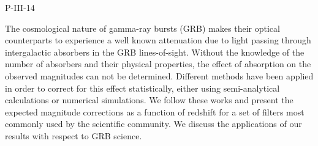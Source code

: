 P-III-14


\bigskip



\bigskip

\noindent The cosmological nature of gamma-ray bursts (GRB) makes their optical counterparts to experience a well known attenuation due to light passing through intergalactic absorbers in the GRB lines-of-sight. Without the knowledge of the number of absorbers and their physical properties, the effect of absorption on the observed magnitudes can not be determined. Different methods have been applied in order to correct for this effect statistically, either using semi-analytical calculations or numerical simulations. We follow these works and present the expected magnitude corrections as a function of redshift for a set of filters most commonly used by the scientific community. We discuss the applications of our results with respect to GRB science.
